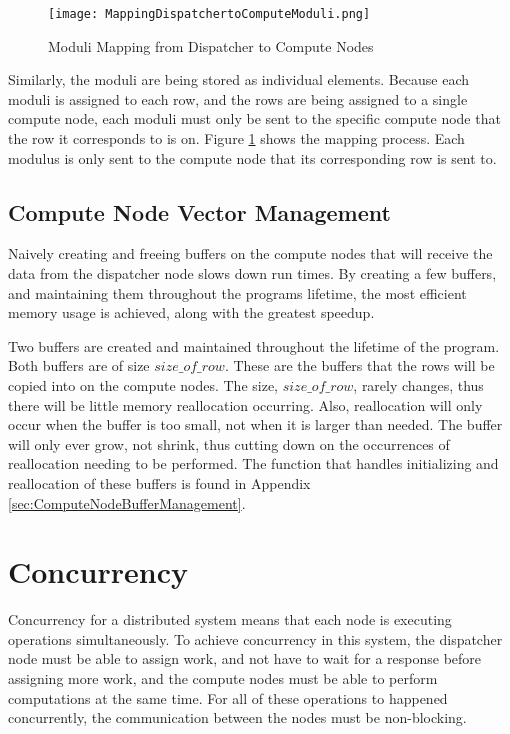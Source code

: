 \begin{figure}[t!]
\centering
\texttt{[image: MappingDispatchertoComputeModuli.png]}
\caption{Moduli Mapping from Dispatcher to Compute Nodes}
\label{fig:MappingDispatcherToComputeModuli}
\end{figure}
Similarly, the moduli are being stored as individual elements. Because each moduli is assigned to each row, and the rows are being assigned to a single compute node, each moduli must only be sent to the specific compute node that the row it corresponds to is on. Figure \ref{fig:MappingDispatcherToComputeModuli} shows the mapping process. Each modulus is only sent to the compute node that its corresponding row is sent to.

\subsection{Compute Node Vector Management}
Naively creating and freeing buffers on the compute nodes that will receive the data from the dispatcher node slows down run times. By creating a few buffers, and maintaining them throughout the programs lifetime, the most efficient memory usage is achieved, along with the greatest speedup.

Two buffers are created and maintained throughout the lifetime of the program. Both buffers are of size $size\_of\_row$. These are the buffers that the rows will be copied into on the compute nodes. The size, $size\_of\_row$, rarely changes, thus there will be little memory reallocation occurring. Also, reallocation will only occur when the buffer is too small, not when it is larger than needed. The buffer will only ever grow, not shrink, thus cutting down on the occurrences of reallocation needing to be performed. The function that handles initializing and reallocation of these buffers is found in Appendix \ref{sec:ComputeNodeBufferManagement}.

\section{Concurrency} \label{sec:Concurrency}
Concurrency for a distributed system means that each node is executing operations simultaneously. To achieve concurrency in this system, the dispatcher node must be able to assign work, and not have to wait for a response before assigning more work, and the compute nodes must be able to perform computations at the same time. For all of these operations to happened concurrently, the communication between the nodes must be non-blocking.

